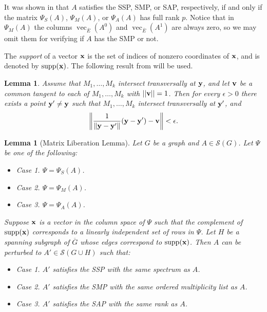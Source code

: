 \documentclass[11pt]{article}
\newtheorem{lem}[thm]{Lemma}
\theoremstyle{definition}
\theoremstyle{definition}
\theoremstyle{definition}
\DeclareMathOperator{\supp}{supp}
\newcommand{\Ec}{\overline{E}}
\newcommand{\verA}{\Psi_A}
\newcommand{\verM}{\Psi_M}
\newcommand{\verS}{\Psi_S}
\newcommand{\Gc}{\overline{G}}
\newcommand{\bx}{{\bf x}}
\newcommand{\bv}{{\bf v}}
\newcommand{\by}{{\bf y}}
\newcommand{\mptn}{\mathcal{S}} %
\newcommand{\vect}{\operatorname{vec}}
\begin{document}
It was shown in \cite{genSAP} that $A$ satisfies the SSP, SMP, or SAP, respectively,
if and only if the matrix $\verS(A)$, $\verM(A)$, or $\verA(A)$
has full rank $p$.  Notice that in $\verM(A)$ the columns  $\vect_{\Ec}(A^0)$ and $\vect_{\Ec}(A^1)$ are always zero, so we may omit them for verifying if $A$ has the SMP or not.  


The {\em support} of a vector $\bx$ is the set of indices of nonzero coordinates of $\bx$, and is denoted by $\supp(\bx)$.  The following result from \cite{HLS} will be used.

\begin{lem}\label{HLStangent}{\rm \cite[Corollary 2.2]{HLS}}  
Assume that $M_1,\ldots, M_k$ intersect transversally at $\by$, and let $\bv$ be a common
tangent to each of $M_1,\ldots,M_k$ with $||\bv||=1$. Then for every $\epsilon>0$ there exists a point $\by'\neq \by$ such that $M_1,\ldots,M_k$ intersect transversally at $\by'$, and
\[\left\|\frac{1}{\|\by-\by'\|}(\by-\by')-\bv\right\|<\epsilon.\]
\end{lem}

\begin{lem} [Matrix Liberation Lemma] \label{mtxliblem}
Let $G$ be a graph and $A\in\mptn(G)$.
Let $\Psi$ be one of the following:
\begin{itemize}
\item Case 1. $\Psi = \verS(A)$.
\item Case 2. $\Psi = \verM(A)$.
\item Case 3. $\Psi = \verA(A)$.
\end{itemize}
Suppose $\bx$ is a vector in the column space of $\Psi$ such
that the complement of $\supp(\bx)$ corresponds to a linearly independent set of rows in $\Psi$. Let
$H$ be a spanning subgraph of $\Gc$ whose edges correspond to $\supp(\bx)$.  Then $A$ can be perturbed to
$A'\in\mptn(G \cup H)$ such that:
\begin{itemize}
\item Case 1. $A'$ satisfies the SSP with the same spectrum as $A$.
\item Case 2. $A'$ satisfies the SMP with the same ordered multiplicity list as $A$.
\item Case 3. $A'$ satisfies the SAP with the same rank as $A$.
\end{itemize}
\end{lem}
\end{document}
